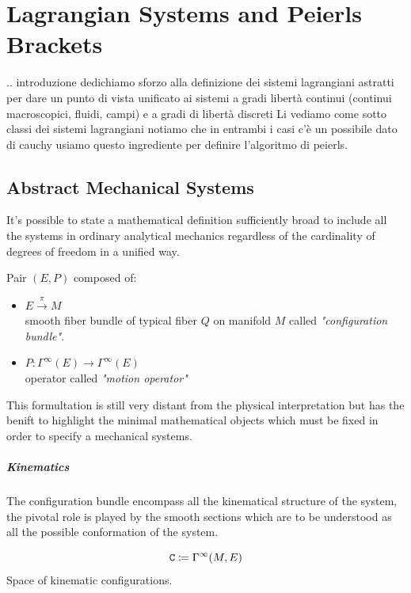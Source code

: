 \documentclass[Main]{subfiles}
\begin{document}
\chapter{Lagrangian Systems and Peierls Brackets}
	\danger .. introduzione
		dedichiamo sforzo alla definizione dei sistemi lagrangiani astratti per dare un punto di vista unificato ai sistemi a gradi libertà continui (continui macroscopici, fluidi, campi) e a gradi di libertà discreti
		Li vediamo come sotto classi dei sistemi lagrangiani
		notiamo che in entrambi i casi c'è un possibile dato di cauchy
		usiamo questo ingrediente per definire l'algoritmo di peierls.
	\danger

	\section{Abstract Mechanical Systems}
	It's possible to state a mathematical definition sufficiently broad to include all the systems in ordinary analytical mechanics regardless of the cardinality of degrees of freedom  in a unified way.
	
	\begin{definition}
		Pair $(E,P )$ composed of:
		\begin{itemize}
			\item $E \xrightarrow{\pi} M$ \\smooth fiber bundle of typical fiber $Q$ on  manifold $M$ called \emph{"configuration bundle"}.
			\item	$ P : \Gamma^\infty(E) \rightarrow \Gamma^\infty(E)$ \\  operator called \emph{"motion operator"}
		\end{itemize}
	\end{definition}
	This formultation is still very distant from the physical interpretation but has the benift to highlight the minimal mathematical objects which must be fixed in order to specify a mechanical systems.
	
	
	\paragraph{Kinematics}
	The configuration bundle encompass all the kinematical structure of the system, the pivotal role is played by the smooth sections  which are to be understood as all the possible conformation of the system.

	\begin{notationfix}
		\begin{displaymath}
			\mathtt{C} \coloneqq \Gamma^\infty(M,E)
		\end{displaymath}
		Space of kinematic configurations.
	\end{notationfix}
\end{document}
